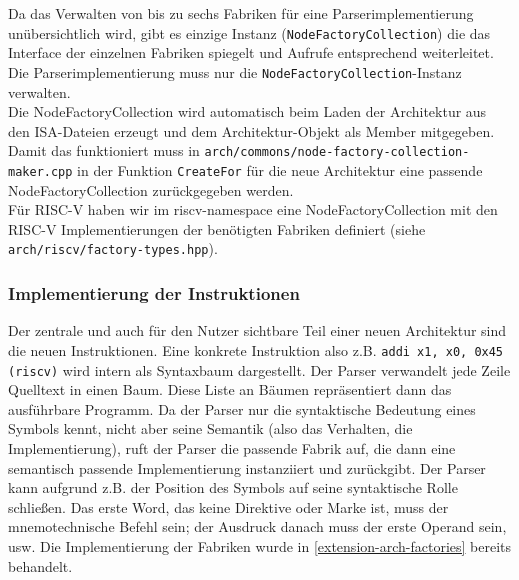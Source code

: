 Da das Verwalten von bis zu sechs Fabriken für eine Parserimplementierung unübersichtlich wird, gibt es einzige Instanz (\texttt{NodeFactoryCollection}) die das Interface der einzelnen Fabriken spiegelt und Aufrufe entsprechend weiterleitet. Die Parserimplementierung muss nur die \texttt{NodeFactoryCollection}-Instanz verwalten.\\
Die NodeFactoryCollection wird automatisch beim Laden der Architektur aus den ISA-Dateien erzeugt und dem Architektur-Objekt als Member mitgegeben. Damit das funktioniert muss in \texttt{arch/commons/node-factory-collection-maker.cpp} in der Funktion \texttt{CreateFor} für die neue Architektur eine passende NodeFactoryCollection zurückgegeben werden.\\
Für RISC-V haben wir im riscv-namespace eine NodeFactoryCollection mit den RISC-V Implementierungen der benötigten Fabriken definiert (siehe \texttt{arch/riscv/factory-types.hpp}).

\subsubsection{Implementierung der Instruktionen}
\label{extension-arch-ast}
Der zentrale und auch für den Nutzer sichtbare Teil einer neuen Architektur sind die neuen Instruktionen. Eine konkrete Instruktion also z.B. \texttt{addi x1, x0, 0x45 (riscv)} wird intern als Syntaxbaum dargestellt. Der Parser verwandelt jede Zeile Quelltext in einen Baum. Diese Liste an Bäumen repräsentiert dann das ausführbare Programm. Da der Parser nur die syntaktische Bedeutung eines Symbols kennt, nicht aber seine Semantik (also das Verhalten, die Implementierung), ruft der Parser die passende Fabrik auf, die dann eine semantisch passende Implementierung instanziiert und zurückgibt. Der Parser kann aufgrund z.B. der Position des Symbols auf seine syntaktische Rolle schließen. Das erste Word, das keine Direktive oder Marke ist, muss der mnemotechnische Befehl sein; der Ausdruck danach muss der erste Operand sein, usw. Die Implementierung der Fabriken wurde in \autoref{extension-arch-factories} bereits behandelt. 